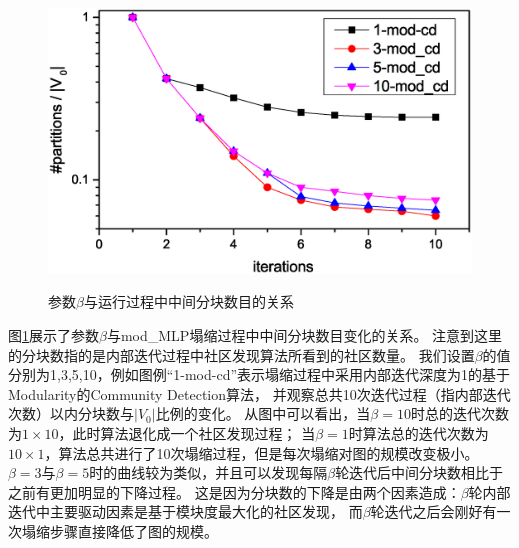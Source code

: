 \documentclass[master]{njuthesis}
\begin{document}
\begin{figure}[h]
  \centering
  \includegraphics[width= 1\textwidth]{figure/conv_time.eps}\\
  \caption{参数$\beta$与运行过程中中间分块数目的关系}
   \label{fig:conv_time}
\end{figure}

图\ref{fig:conv_time}展示了参数$\beta$与mod\string_MLP塌缩过程中中间分块数目变化的关系。
注意到这里的分块数指的是内部迭代过程中社区发现算法所看到的社区数量。
我们设置$\beta$的值分别为1,3,5,10，例如图例“1-mod-cd”表示塌缩过程中采用内部迭代深度为1的基于Modularity的Community Detection算法，
并观察总共10次迭代过程（指内部迭代次数）以内分块数与$|V_0|$比例的变化。
从图中可以看出，当$\beta=10$时总的迭代次数为$1\times 10$，此时算法退化成一个社区发现过程；
当$\beta=1$时算法总的迭代次数为$10\times 1$，算法总共进行了10次塌缩过程，但是每次塌缩对图的规模改变极小。
$\beta=3$与$\beta=5$时的曲线较为类似，并且可以发现每隔$\beta$轮迭代后中间分块数相比于之前有更加明显的下降过程。
这是因为分块数的下降是由两个因素造成：$\beta$轮内部迭代中主要驱动因素是基于模块度最大化的社区发现，
而$\beta$轮迭代之后会刚好有一次塌缩步骤直接降低了图的规模。
\end{document}
